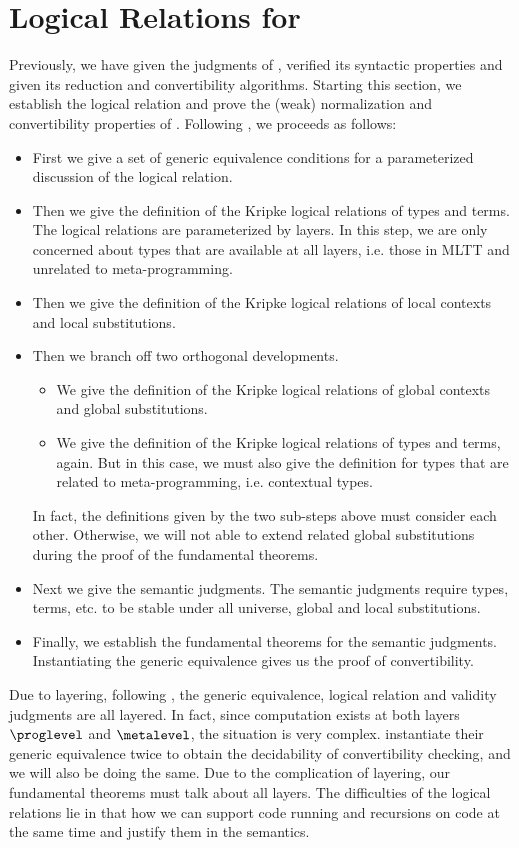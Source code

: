 \section{Logical Relations for \delamlang}

Previously, we have given the judgments of \delamlang, verified its syntactic
properties and given its reduction and convertibility algorithms. %
Starting this section, we establish the logical relation and prove the (weak)
normalization and convertibility properties of \delamlang. %
Following \citet{abel_decidability_2017}, we proceeds as follows:
\begin{itemize}
\item First we give a set of generic equivalence conditions for a parameterized
  discussion of the logical relation.
\item Then we give the definition of the Kripke logical relations of types and
  terms. %
  The logical relations are parameterized by layers. %
  In this step, we are only concerned about types that are available at all layers,
  i.e. those in MLTT and unrelated to meta-programming. 
\item Then we give the definition  of the Kripke logical relations of local contexts
  and local substitutions. %
\item Then we branch off two orthogonal developments.
  \begin{itemize}
  \item We give the definition of the Kripke logical relations of global contexts and
    global substitutions.
  \item We give the definition of the Kripke logical relations of types and terms,
    again. %
    But in this case, we must also give the definition for types that are related to
    meta-programming, i.e. contextual types. %
  \end{itemize}
  In fact, the definitions given by the two sub-steps above must consider each
  other. %
  Otherwise, we will not able to extend related global substitutions during the proof
  of the fundamental theorems. 
\item Next we give the semantic judgments. %
  The semantic judgments require types, terms, etc. to be stable under all universe,
  global and local substitutions. %
\item Finally, we establish the fundamental theorems for the semantic judgments. %
  Instantiating the generic equivalence gives us the proof of convertibility.
\end{itemize}
Due to layering, following , the generic equivalence, logical
relation and validity judgments are all layered. %
In fact, since computation exists at both layers $\proglevel$ and $\metalevel$, the situation is very
complex. %
\citet{abel_decidability_2017} instantiate their generic equivalence twice to obtain
the decidability of convertibility checking, and we will also be doing the same. %
Due to the complication of layering, our fundamental theorems must talk about all
layers. %
The difficulties of the logical relations lie in that how we can support code running
and recursions on code at the same time and justify them in the semantics. %

